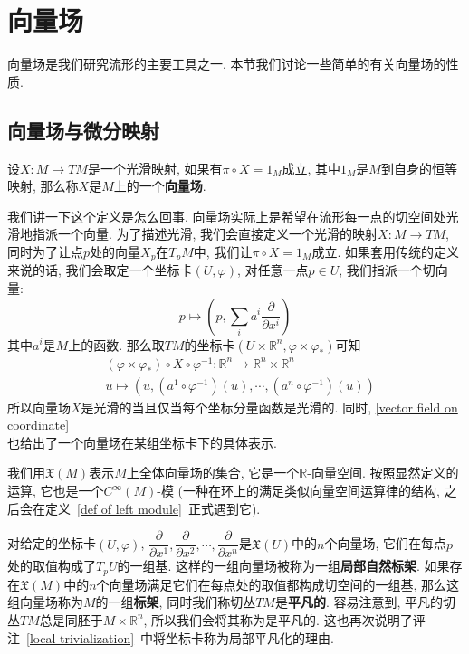 \section{向量场}
向量场是我们研究流形的主要工具之一, 本节我们讨论一些简单的有关向量场的性质.

\subsection*{向量场与微分映射}
\begin{defn}
    设$X:M\to TM$是一个光滑映射, 如果有$\pi\circ X=1_M$成立, 其中$1_M$是$M$到自身的恒等映射, 那么称$X$是$M$上的一个\textbf{向量场}.
\end{defn}
\begin{rem}
    我们讲一下这个定义是怎么回事.
    向量场实际上是希望在流形每一点的切空间处光滑地指派一个向量.
    为了描述光滑, 我们会直接定义一个光滑的映射$X:M\to TM$, 同时为了让点$p$处的向量$X_p$在$T_pM$中, 我们让$\pi\circ X=1_M$成立.
    如果套用传统的定义来说的话, 我们会取定一个坐标卡$(U,\varphi)$, 对任意一点$p\in U$, 我们指派一个切向量:
    \begin{equation}
        p\mapsto\left(p,\sum_{i}a^i\frac{\partial}{\partial x^i}\right)\label{vector field on coordinate}
    \end{equation}
    其中$a^i$是$M$上的函数.
    那么取$TM$的坐标卡$(U\times\mathbb{R}^n,\varphi\times\varphi_*)$可知
    \begin{align*}
        &(\varphi\times\varphi_*)\circ X\circ\varphi^{-1}:\mathbb{R}^n\to\mathbb{R}^n\times\mathbb{R}^n\\
        &u\mapsto\left(u,(a^1\circ\varphi^{-1})(u),\cdots,(a^n\circ\varphi^{-1})(u)\right)
    \end{align*}
    所以向量场$X$是光滑的当且仅当每个坐标分量函数是光滑的.
    同时, \eqref{vector field on coordinate}\\也给出了一个向量场在某组坐标卡下的具体表示.
\end{rem}
\begin{sym}
    我们用$\mathfrak{X}(M)$表示$M$上全体向量场的集合, 它是一个$\mathbb{R}$-向量空间.
    按照显然定义的运算, 它也是一个$C^\infty(M)$-模 (一种在环上的满足类似向量空间运算律的结构, 之后会在定义~\ref{def of left module}~正式遇到它).
\end{sym}
\begin{eg}
    对给定的坐标卡$(U,\varphi)$, $\dfrac{\partial}{\partial x^1},\dfrac{\partial}{\partial x^2},\cdots,\dfrac{\partial}{\partial x^n}$是$\mathfrak{X}(U)$中的$n$个向量场, 它们在每点$p$处的取值构成了$T_pU$的一组基.
    这样的一组向量场被称为一组\textbf{局部自然标架}.
    如果存在$\mathfrak{X}(M)$中的$n$个向量场满足它们在每点处的取值都构成切空间的一组基, 那么这组向量场称为$M$的一组\textbf{标架}, 同时我们称切丛$TM$是\textbf{平凡的}.
    容易注意到, 平凡的切丛$TM$总是同胚于$M\times\mathbb{R}^n$, 所以我们会将其称为是平凡的.
    这也再次说明了评注~\ref{local trivialization}~中将坐标卡称为局部平凡化的理由.
\end{eg}

